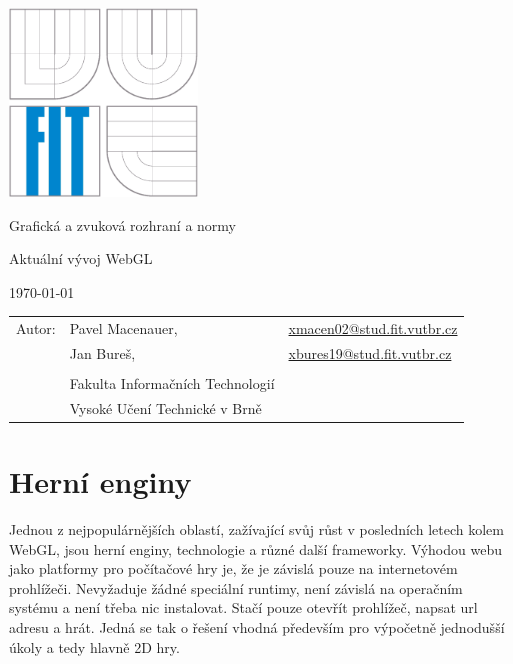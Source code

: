 \documentclass[12pt,a4paper,titlepage,final]{report}
\makeatletter
\newcommand\Course{	Grafická a zvuková rozhraní a normy}
\newcommand\WorkTitle{Aktuální vývoj WebGL}
\newcommand\AuthorA{Pavel Macenauer}
\newcommand\AuthorB{Jan Bureš}
\newcommand\AuthorAEmail{xmacen02@stud.fit.vutbr.cz}
\newcommand\AuthorBEmail{xbures19@stud.fit.vutbr.cz}
\newcommand\Faculty{Fakulta Informačních Technologií}
\newcommand\School{Vysoké Učení Technické v Brně}
\makeatother
\begin{document}
	\begin{titlepage}
	\begin{center}
		\includegraphics[height=5cm]{images/logo.eps}
	\end{center}
	\vfill
	\begin{center}
		\begin{Large}
			\Course\\
		\end{Large}
		\bigskip
		\begin{Huge}
			\WorkTitle\\
		\end{Huge}
	\end{center}
	\vfill
	\begin{center}
		\begin{large}
			\today
		\end{large}
	\end{center}
	\vfill
	\begin{flushleft}
		\begin{large}
			\begin{tabular}{lll}
				Autor: & \AuthorA, & \url{\AuthorAEmail} \\
				& \AuthorB, & \url{\AuthorBEmail} \\
		
				& & \\
				& \Faculty \\
				& \School \\
			\end{tabular}
		\end{large}
	\end{flushleft}
\end{titlepage}		



\newpage
\section{Herní enginy}

Jednou z nejpopulárnějších oblastí, zažívající svůj růst v posledních letech kolem WebGL, jsou herní enginy, technologie a různé další frameworky. Výhodou webu jako platformy pro počítačové hry je, že je závislá pouze na internetovém prohlížeči. Nevyžaduje žádné speciální runtimy, není závislá na operačním systému a není třeba nic instalovat. Stačí pouze otevřít prohlížeč, napsat url adresu a hrát. Jedná se tak o řešení vhodná především pro výpočetně jednodušší úkoly a tedy 
hlavně 2D hry.
\end{document}
